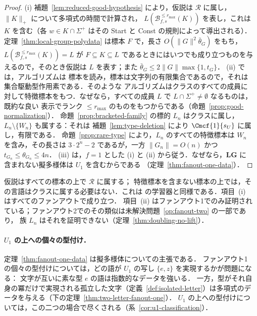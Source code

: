 \begin{proof}
(i) 補題~\ref{lem:reduced-good-hypothesis} により，仮説は
$\mathcal R$ に属し，$\|K\|_+$ について多項式の時間で計算され，
$L(\mathcal B^{\le r_{\max}}_{f,s}(K))$ を表し，これは $K$ を含む（各 $w\in K\cap\Sigma^+$
はその Start と Const の規則によって導出される）．
定理~\ref{thm:local-group-polydata} は標本 $F$ で，長さ
$O(\|G\|^2\bar\theta_G)$ をもち，$L(\mathcal B^{\le r_{\max}}_{f,s}(K))=L$ が
$F\subseteq K\subseteq L$ であるときにはいつでも成り立つものを与えるので，そのとき仮説は $L$ を表す；また
$\bar\theta_G\le2\|G\|\max\{1,t_G\}$．
(ii) \cite[Definition~2.12]{EyraudHeinzYoshinaka2016} では，アルゴリズムは
標本を読み，標本は文字列の有限集合であるので，それは集合駆動型作用素である．そのような
アルゴリズムはクラスのすべての成員に対して特徴標本をもつ．なぜなら，すべての成員 $L$ で $L\cap\Sigma^+\ne\emptyset$ なるものは，既約な良い
表示でランク $\le r_{\max}$ のものをもつからである（命題~\ref{prop:good-normalization}）．
命題~\ref{prop:bracketed-family} の標的 $L_n$ はクラスに属し，
$L_n\setminus\{W_n\}$ も属する：それは
補題~\ref{lem:type-deletion} により $\Cmcf{1}{s_U}$ に属し，有限である．
命題~\ref{prop:rare-type} により，$L_n$ のすべての特徴標本は
$W_n$ を含み，その長さは $3\cdot2^n-2$ であるが，一方 $\|G_n\|=O(n)$ かつ $t_{G_n}\le\theta_{G_n}\le4n$．
(iii) は，$f=1$ とした (i) と (ii) から従う．なぜなら，$\mathbf{LG}$ に
含まれない擬多様体は $U_1$ を含むからである
（定理~\ref{thm:fanout-one-data}）．
\end{proof}

仮説はすべての標本の上で $\mathcal R$ に属する；
特徴標本を含まない標本の上では，その言語はクラスに属する必要はない．これは
\cite{Yoshinaka2011} の学習器と同様である．項目~(i) はすべてのファンアウトで成り立つ．
項目~(ii) はファンアウト1でのみ証明されている；ファンアウト2でのその類似は未解決問題~\ref{op:fanout-two} の一部であり，
族 $L_n$ はそれを証明できない（定理~\ref{thm:doubling-no-lift}）．

\paragraph{$U_1$ の上への個々の型付け．}
定理~\ref{thm:fanout-one-data} は擬多様体についての主張である．
ファンアウト1の個々の型付けについては，どの語が $U_1$ の写し $\{e,z\}$ を実現するかが問題になる：
文字が互いに素な型 $e$ の語は指数的なデータを強いる．
一方，型がそれ自身の冪だけで実現される孤立した文字（定義~\ref{def:isolated-letter}）は多項式のデータを与える（下の定理~\ref{thm:two-letter-fanout-one}）．
$U_1$ の上への型付けについては，この二つの場合で尽くされる（系~\ref{cor:u1-classification}）．

